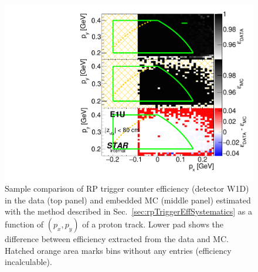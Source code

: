\begin{figure}[h]%
	\centering
	\parbox{0.4725\textwidth}{
		\centering
		\includegraphics[width=\linewidth,page=7]{graphics/systematicsEfficiency/RpSyst/relativeTriggerEff2D_pxpy.pdf}%
	}
	\quad
	\parbox{0.4725\textwidth}{
		\centering\vspace*{-100pt}
		\caption[Coparison of estimated RP trigger counter efficiency in 2D (detector W1D).]%
    {Sample comparison of RP trigger counter efficiency (detector W1D) in the data (top panel) and embedded MC (middle panel) estimated with the method described in Sec.~\ref{sec:rpTriggerEffSystematics} as a function of $(p_{x},p_{y})$ of a proton track. Lower pad shows the difference between efficiency extracted from the data and MC. Hatched orange area marks bins without any entries (efficiency incalculable).%
    }
	}
	\label{fig:relativeRpRecoEff_W1D}
\end{figure}




